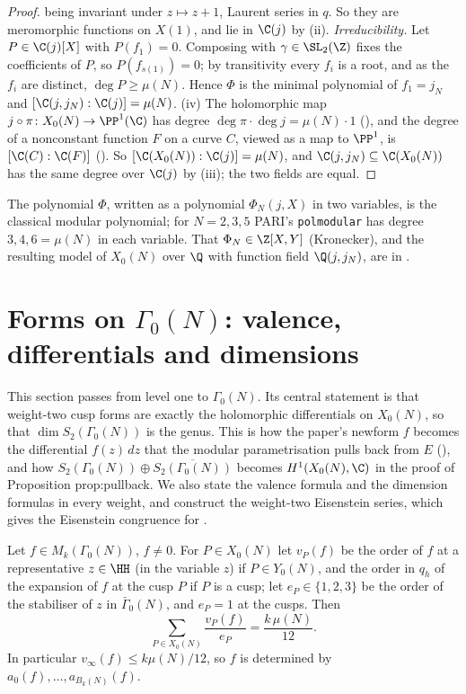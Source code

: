 \begin{proof}
being invariant under $z\mapsto z+1$, Laurent series in $q$.
So they are meromorphic functions on $X(1)$, and lie in $\C(j)$ by (ii).
\emph{Irreducibility.} Let $P\in\C(j)[X]$ with $P(f_1)=0$. Composing with $\gamma\in\SL_2(\Z)$ fixes the coefficients of $P$, so $P(f_{s(1)})=0$; by transitivity every $f_i$ is a root, and
as the $f_i$ are distinct, $\deg P\ge\mu(N)$. Hence $\Phi$ is the minimal polynomial of $f_1=j_N$ and $[\C(j,j_N):\C(j)]=\mu(N)$.
(iv) The holomorphic map $j\circ\pi\colon X_0(N)\to\PP^1(\C)$ has degree $\deg\pi\cdot\deg j=\mu(N)\cdot1$ (), and the degree of a
nonconstant function $F$ on a curve $C$, viewed as a map to $\PP^1$, is $[\C(C):\C(F)]$ (). So $[\C(X_0(N)):\C(j)]=\mu(N)$, and $\C(j,j_N)\subseteq\C(X_0(N))$
has the same degree over $\C(j)$ by (iii); the two fields are equal.
\end{proof}

The polynomial $\Phi$, written as a polynomial $\Phi_N(j,X)$ in two variables, is the classical modular polynomial; for $N=2,3,5$ PARI's \texttt{polmodular} has degree $3,4,6=\mu(N)$ in
each variable. That $\Phi_N\in\Z[X,Y]$ (Kronecker), and the resulting model of $X_0(N)$ over $\Q$ with function field $\Q(j,j_N)$, are in .

\section{Forms on \texorpdfstring{$\Gamma_0(N)$}{Gamma0(N)}: valence, differentials and dimensions}\label{sec:modforms:gamma0}

This section passes from level one to $\Gamma_0(N)$. Its central statement is that weight-two cusp forms are exactly the holomorphic differentials on $X_0(N)$,
so that $\dim S_2(\Gamma_0(N))$ is the genus. This is how the paper's newform $f$ becomes the differential $f(z)\,dz$ that the modular parametrisation pulls back
from $E$ (), and how $S_2(\Gamma_0(N))\oplus\overline{S_2(\Gamma_0(N))}$ becomes $H^1(X_0(N),\C)$ in the proof of Proposition prop:pullback. We also state the valence
formula and the dimension formulas in every weight, and construct the weight-two Eisenstein series, which gives the Eisenstein congruence for .

\begin{theorem}\label{thm:modforms:valence-gamma0}
Let $f\in M_k(\Gamma_0(N))$, $f\ne0$. For $P\in X_0(N)$ let $v_P(f)$ be the order of $f$ at a representative $z\in\HH$ (in the variable $z$) if $P\in Y_0(N)$, and the order in $q_h$ of the
expansion of $f$ at the cusp $P$ if $P$ is a cusp; let $e_P\in\{1,2,3\}$ be the order of the stabiliser of $z$ in $\bar\Gamma_0(N)$, and $e_P=1$ at the cusps. Then
\[
\sum_{P\in X_0(N)}\frac{v_P(f)}{e_P}=\frac{k\,\mu(N)}{12}.
\]
In particular $v_\infty(f)\le k\mu(N)/12$, so $f$ is determined by $a_0(f),\dots,a_{B_k(N)}(f)$.
\end{theorem}

